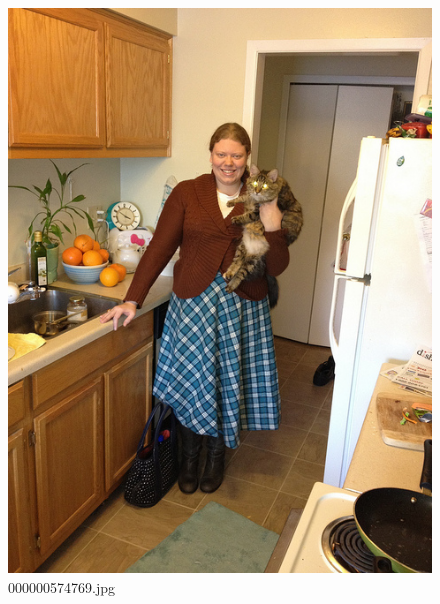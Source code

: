 \begin{figure}[h]
    \centering
    \includegraphics[width=0.8\linewidth]{../image set/hard/000000574769.jpg}
    \caption{000000574769.jpg}
\end{figure}
